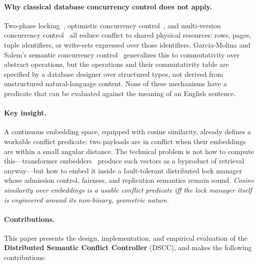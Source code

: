 \documentclass[sigconf]{acmart}
\begin{document}
\paragraph{\textbf{Why classical database concurrency control does not apply.}}
Two-phase locking~\cite{gray1976granularity},
optimistic concurrency control~\cite{kung1981optimistic}, and multi-version
concurrency control~\cite{bernstein1983multiversion} all reduce conflict to
shared physical resources: rows, pages, tuple identifiers, or write-sets
expressed over those identifiers. Garcia-Molina and Salem's semantic
concurrency control~\cite{garcia-molina1983} generalizes this to commutativity
over abstract operations, but the operations and their commutativity table are
specified by a database designer over structured types, not derived from
unstructured natural-language content. None of these mechanisms have a
predicate that can be evaluated against the meaning of an English sentence.

\paragraph{\textbf{Key insight.}}
A continuous embedding space, equipped with cosine similarity, already
defines a workable conflict predicate: two payloads are in conflict
when their embeddings are within a small angular distance. The technical
problem is not how to compute this---transformer
embedders~\cite{reimers2019sbert,bge,qwen3} produce such vectors as a
byproduct of retrieval anyway---but how to embed it inside a fault-tolerant
distributed lock manager whose admission control, fairness, and
replication semantics remain sound. \emph{Cosine similarity over embeddings
is a usable conflict predicate iff the lock manager itself is engineered
around its non-binary, geometric nature.}

\paragraph{\textbf{Contributions.}}
This paper presents the design, implementation, and empirical evaluation of
the \textbf{Distributed Semantic Conflict Controller} (DSCC), and makes the
following contributions:
\end{document}
